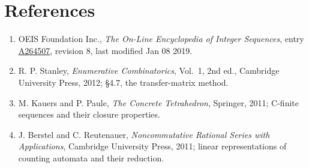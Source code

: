 \documentclass[11pt]{article}
\theoremstyle{definition}
\begin{document}
\section{References}

\begin{enumerate}

\item OEIS Foundation Inc., \emph{The On-Line Encyclopedia of Integer Sequences}, entry \href{https://oeis.org/A264507}{A264507}, revision 8, last modified Jan 08 2019.

\item R. P. Stanley, \emph{Enumerative Combinatorics}, Vol.~1, 2nd ed., Cambridge University Press, 2012; \S4.7, the transfer-matrix method.

\item M. Kauers and P. Paule, \emph{The Concrete Tetrahedron}, Springer, 2011; C-finite sequences and their closure properties.

\item J. Berstel and C. Reutenauer, \emph{Noncommutative Rational Series with Applications}, Cambridge University Press, 2011; linear representations of counting automata and their reduction.

\end{enumerate}
\end{document}
